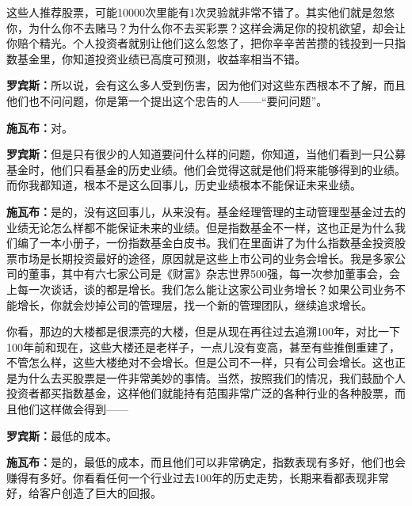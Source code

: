 这些人推荐股票，可能10000次里能有1次灵验就非常不错了。其实他们就是忽悠你，为什么你不去赌马？为什么你不去买彩票？这样会满足你的投机欲望，却会让你赔个精光。个人投资者就别让他们这么忽悠了，把你辛辛苦苦攒的钱投到一只指数基金里，你知道投资业绩已高度可预测，收益率相当不错。

\begin{BookQuote}
\textbf{罗宾斯：}所以说，会有这么多人受到伤害，因为他们对这些东西根本不了解，而且他们也不问问题，你是第一个提出这个忠告的人——“要问问题”。
\end{BookQuote}

\begin{BookQuote}
\textbf{施瓦布：}对。
\end{BookQuote}

\begin{BookQuote}
\textbf{罗宾斯：}但是只有很少的人知道要问什么样的问题，你知道，当他们看到一只公募基金时，他们只看基金的历史业绩。他们会觉得这就是他们将来能够得到的业绩。而你我都知道，根本不是这么回事儿，历史业绩根本不能保证未来业绩。
\end{BookQuote}

\begin{BookQuote}
\textbf{施瓦布：}是的，没有这回事儿，从来没有。基金经理管理的主动管理型基金过去的业绩无论怎么样都不能保证未来的业绩。但是指数基金不一样，这也正是为什么我们编了一本小册子，一份指数基金白皮书。我们在里面讲了为什么指数基金投资股票市场是长期投资最好的途径，原因就是这些上市公司的业务会增长。我是多家公司的董事，其中有六七家公司是《财富》杂志世界500强，每一次参加董事会，会上每一次谈话，谈的都是增长。我们怎么能让这家公司业务增长？如果公司业务不能增长，你就会炒掉公司的管理层，找一个新的管理团队，继续追求增长。
\end{BookQuote}

你看，那边的大楼都是很漂亮的大楼，但是从现在再往过去追溯100年，对比一下100年前和现在，这些大楼还是老样子，一点儿没有变高，甚至有些推倒重建了，不管怎么样，这些大楼绝对不会增长。但是公司不一样，只有公司会增长。这也正是为什么去买股票是一件非常美妙的事情。当然，按照我们的情况，我们鼓励个人投资者都买指数基金，这样他们就能持有范围非常广泛的各种行业的各种股票，而且他们这样做会得到——

\begin{BookQuote}
\textbf{罗宾斯：}最低的成本。
\end{BookQuote}

\begin{BookQuote}
\textbf{施瓦布：}是的，最低的成本，而且他们可以非常确定，指数表现有多好，他们也会赚得有多好。你看看任何一个行业过去100年的历史走势，长期来看都表现非常好，给客户创造了巨大的回报。
\end{BookQuote}

